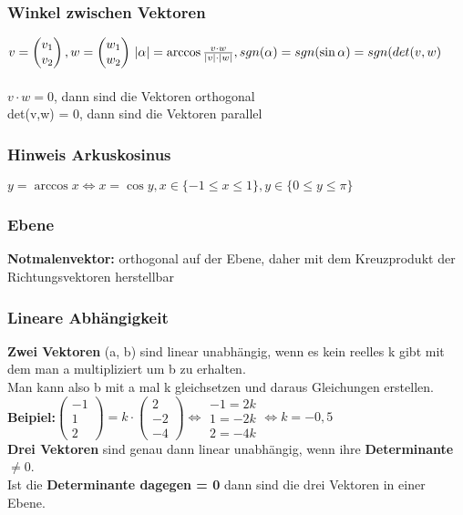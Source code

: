 \documentclass[6pt,a4paper]{scrartcl}
\newcommand{\abs}[1]{\ensuremath{\left\vert#1\right\vert}}
\begin{document}
\begin{multicols*}{3}
\subsubsection{Winkel zwischen Vektoren}
$v = \begin{pmatrix}v_1\\v_2\end{pmatrix}, w = \begin{pmatrix}w_1\\w_2\end{pmatrix}
\\
\abs{\alpha} = \arccos{\frac{v \cdot w}{\abs{v} \cdot \abs{w}}}, sgn(\alpha) = sgn(\sin{\alpha}) = sgn(det(v,w)$\\
\\
$v \cdot w = 0$, dann sind die Vektoren orthogonal\\
det(v,w) = 0, dann sind die Vektoren parallel
\\
\subsubsection{Hinweis Arkuskosinus}
$y = \arccos{x} \Leftrightarrow x = \cos{y}, x \in \{-1 \leq x \leq 1 \}, y \in \{0 \leq y \leq \pi\}$
\subsubsection{Ebene}
\textbf{Notmalenvektor:} orthogonal auf der Ebene, daher mit dem Kreuzprodukt der Richtungsvektoren herstellbar\\

\subsubsection{Lineare Abhängigkeit}
\textbf{Zwei Vektoren} (a, b) sind linear unabhängig, wenn es kein reelles k gibt mit dem man a multipliziert um b zu erhalten.\\
Man kann also b mit a mal k gleichsetzen und daraus Gleichungen erstellen.\\
\textbf{Beipiel:}$\begin{pmatrix}-1\\1\\2\end{pmatrix}=k\cdot \begin{pmatrix}2\\-2\\-4\end{pmatrix} \Leftrightarrow \begin{matrix}-1 = 2k\\1 = -2k\\2 = -4k\end{matrix}\Leftrightarrow k=-0,5
$\\
\textbf{Drei Vektoren} sind genau dann linear unabhängig, wenn ihre \textbf{Determinante $\neq 0$}. 
\\
Ist die \textbf{Determinante dagegen = 0} dann sind die drei Vektoren in einer Ebene.

\end{multicols*}
\end{document}
